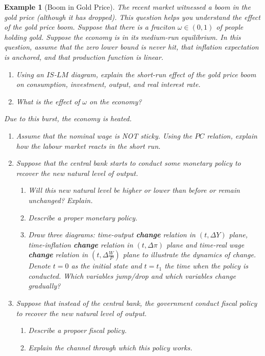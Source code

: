 \documentclass[12pt]{article}
\newtheorem{example}{Example}
\begin{document}
\begin{example}[Boom in Gold Price]
  The recent market witnessed a boom in the gold price (although it has dropped). This question helps you understand the effect of the gold price boom. Suppose that there is a fraciton $\omega \in (0,1)$ of people holding gold. Suppose the economy is in its medium-run equilibrium. In this question, assume that the zero lower bound is never hit, that inflation expectation is anchored, and that production function is linear.
  \begin{enumerate}[label=(\arabic*)]
    \item Using an $IS$-$LM$ diagram, explain the short-run effect of the gold price boom on consumption, investment, output, and real interest rate. 
    \vspace{80pt}
    \item What is the effect of $\omega$ on the economy?
  \end{enumerate}
  \newpage
  Due to this burst, the economy is heated.
  \begin{enumerate}[label=(\arabic*),resume] 
    \item Assume that the nominal wage is NOT sticky. Using the $PC$ relation, explain how the labour market reacts in the short run. 
    \vspace{80pt}
    \item Suppose that the central bank starts to conduct some monetary policy to recover the new natural level of output.
    \begin{enumerate}[label=\alph*.]
      \item Will this new natural level be higher or lower than before or remain unchanged? Explain.
      \vspace{80pt}
      \item Describe a proper monetary policy.
      \vspace{80pt}
      \item Draw three diagrams: time-output \textbf{change} relation in $(t, \Delta Y)$ plane, time-inflation \textbf{change}  relation in $(t, \Delta \pi)$ plane and time-real wage \textbf{change}  relation in $(t, \Delta \frac{W}{P})$ plane to illustrate the dynamics of change. Denote $t=0$ as the initial state and $t=t_1$ the time when the policy is conducted. Which variables jump/drop and which variables change gradually?
    \end{enumerate}
    \vspace{120pt}
    \newpage
    \item Suppose that instead of the central bank, the government conduct fiscal policy to recover the new natural level of output. 
    \begin{enumerate}
      \item Describe a propoer fiscal policy.
      \vspace{80pt}
      \item Explain the channel through which this policy works.
      \vspace{80pt}
    \end{enumerate}
  \end{enumerate} 
\end{example}
\end{document}
